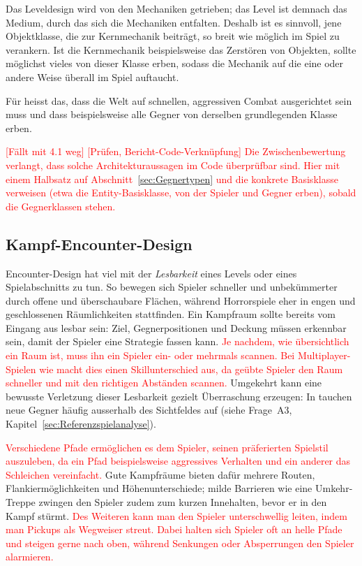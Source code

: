 \documentclass[../Main.tex]{subfiles}
\begin{document}
Das Leveldesign wird von den Mechaniken getrieben; das Level ist demnach das Medium, durch das sich die Mechaniken entfalten.\autocite{gdc_tenprinciples2010} Deshalb ist es sinnvoll, jene Objektklasse, die zur Kernmechanik beiträgt, so breit wie möglich im Spiel zu verankern. Ist die Kernmechanik beispielsweise das Zerstören von Objekten, sollte möglichst vieles von dieser Klasse erben, sodass die Mechanik auf die eine oder andere Weise überall im Spiel auftaucht.\autocite{gdc_movingmountains2020}

Für  heisst das, dass die Welt auf schnellen, aggressiven Combat ausgerichtet sein muss und dass beispielsweise alle Gegner von derselben grundlegenden Klasse erben.\endgroup

\textcolor{red}{[Fällt mit 4.1 weg] [Prüfen, Bericht-Code-Verknüpfung] Die Zwischenbewertung verlangt, dass solche Architekturaussagen im Code überprüfbar sind. Hier mit einem Halbsatz auf Abschnitt~\ref{sec:Gegnertypen} und die konkrete Basisklasse verweisen (etwa die Entity-Basisklasse, von der Spieler und Gegner erben), sobald die Gegnerklassen stehen.}


\subsection{Kampf-Encounter-Design} \label{sec:Encounter}
Encounter-Design hat viel mit der \textit{Lesbarkeit} eines Levels oder eines Spielabschnitts zu tun. So bewegen sich Spieler schneller und unbekümmerter durch offene und überschaubare Flächen, während Horrorspiele eher in engen und geschlossenen Räumlichkeiten stattfinden. Ein Kampfraum sollte bereits vom Eingang aus lesbar sein: Ziel, Gegnerpositionen und Deckung müssen erkennbar sein, damit der Spieler eine Strategie fassen kann.\autocite{gdc_horizonquests2018} \textcolor{red}{Je nachdem, wie übersichtlich ein Raum ist, muss ihn ein Spieler ein- oder mehrmals scannen. Bei Multiplayer-Spielen wie  macht dies einen Skillunterschied aus, da geübte Spieler den Raum schneller und mit den richtigen Abständen scannen.\autocite{totten2014architectural}} Umgekehrt kann eine bewusste Verletzung dieser Lesbarkeit gezielt Überraschung erzeugen: In  tauchen neue Gegner häufig ausserhalb des Sichtfeldes auf (siehe Frage~A3, Kapitel~\ref{sec:Referenzspielanalyse}).

\textcolor{red}{Verschiedene Pfade ermöglichen es dem Spieler, seinen präferierten Spielstil auszuleben, da ein Pfad beispielsweise aggressives Verhalten und ein anderer das Schleichen vereinfacht.\autocite{gdc_tenprinciples2010}} Gute Kampfräume bieten dafür mehrere Routen, Flankiermöglichkeiten und Höhenunterschiede; milde Barrieren wie eine Umkehr-Treppe zwingen den Spieler zudem zum kurzen Innehalten, bevor er in den Kampf stürmt.\autocite{gdc_horizonquests2018} \textcolor{red}{Des Weiteren kann man den Spieler unterschwellig leiten, indem man Pickups als Wegweiser streut. Dabei halten sich Spieler oft an helle Pfade und steigen gerne nach oben, während Senkungen oder Absperrungen den Spieler alarmieren.\autocite{rogers2014levelup}}
\end{document}
